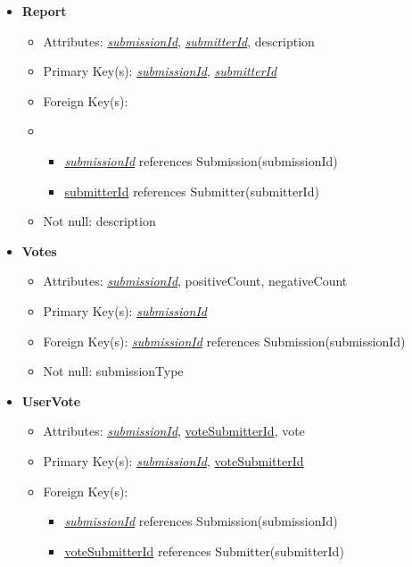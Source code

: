 \begin{itemize}
        \item \textbf{Report}
        \begin{itemize}
            \item Attributes: \underline{\textit{submissionId}}, \underline{\textit{submitterId}}, description
            \item Primary Key(s): \underline{\textit{submissionId}}, \underline{\textit{submitterId}}
            \item Foreign Key(s):
            \item \begin{itemize}
                \item \underline{\textit{submissionId}} references Submission(submissionId)
                \item \underline{submitterId} references Submitter(submitterId)
            \end{itemize} 
            \item Not null: description
        \end{itemize}

        \item \textbf{Votes}
        \begin{itemize}
            \item Attributes: \underline{\textit{submissionId}}, positiveCount, negativeCount
            \item Primary Key(s): \underline{\textit{submissionId}}
            \item Foreign Key(s): \underline{\textit{submissionId}} references Submission(submissionId)
            \item Not null: submissionType
        \end{itemize}

        \item \textbf{UserVote}
        \begin{itemize}
            \item Attributes: \underline{\textit{submissionId}}, \underline{voteSubmitterId}, vote
            \item Primary Key(s): \underline{\textit{submissionId}}, \underline{voteSubmitterId}
            \item Foreign Key(s): 
            \begin{itemize}
                \item \underline{\textit{submissionId}} references Submission(submissionId)
                \item \underline{voteSubmitterId} references Submitter(submitterId)
            \end{itemize}
        \end{itemize}


\end{itemize}
